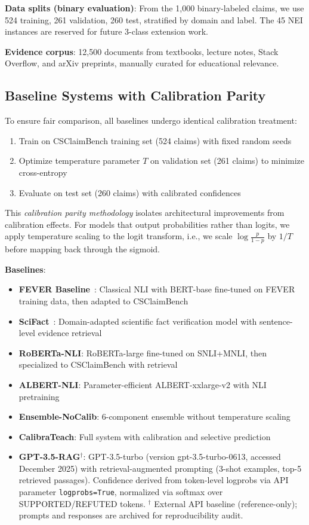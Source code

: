 \documentclass[journal]{IEEEtran}
\begin{document}
\textbf{Data splits (binary evaluation)}: From the 1,000 binary-labeled claims, we use 524 training, 261 validation, 260 test, stratified by domain and label. The 45 NEI instances are reserved for future 3-class extension work.

\textbf{Evidence corpus}: 12,500 documents from textbooks, lecture notes, Stack Overflow, and arXiv preprints, manually curated for educational relevance.

\subsection{Baseline Systems with Calibration Parity}

To ensure fair comparison, all baselines undergo identical calibration treatment:

\begin{enumerate}
    \item Train on CSClaimBench training set (524 claims) with fixed random seeds
    \item Optimize temperature parameter $T$ on validation set (261 claims) to minimize cross-entropy
    \item Evaluate on test set (260 claims) with calibrated confidences
\end{enumerate}

This \textit{calibration parity methodology} isolates architectural improvements from calibration effects. For models that output probabilities rather than logits, we apply temperature scaling to the logit transform, i.e., we scale $\log\frac{p}{1-p}$ by $1/T$ before mapping back through the sigmoid.

\textbf{Baselines}:
\begin{itemize}
    \item \textbf{FEVER Baseline}~\cite{FEVER2018}: Classical NLI with BERT-base fine-tuned on FEVER training data, then adapted to CSClaimBench
    \item \textbf{SciFact}~\cite{SciFact2020}: Domain-adapted scientific fact verification model with sentence-level evidence retrieval
    \item \textbf{RoBERTa-NLI}: RoBERTa-large fine-tuned on SNLI+MNLI, then specialized to CSClaimBench with retrieval
    \item \textbf{ALBERT-NLI}: Parameter-efficient ALBERT-xxlarge-v2 with NLI pretraining
    \item \textbf{Ensemble-NoCalib}: 6-component ensemble without temperature scaling
    \item \textbf{CalibraTeach}: Full system with calibration and selective prediction
    \item \textbf{GPT-3.5-RAG}$^{\dagger}$: GPT-3.5-turbo (version gpt-3.5-turbo-0613, accessed December 2025) with retrieval-augmented prompting (3-shot examples, top-5 retrieved passages). Confidence derived from token-level logprobs via API parameter \texttt{logprobs=True}, normalized via softmax over SUPPORTED/REFUTED tokens. $^{\dagger}$ External API baseline (reference-only); prompts and responses are archived for reproducibility audit.
\end{itemize}
\end{document}
